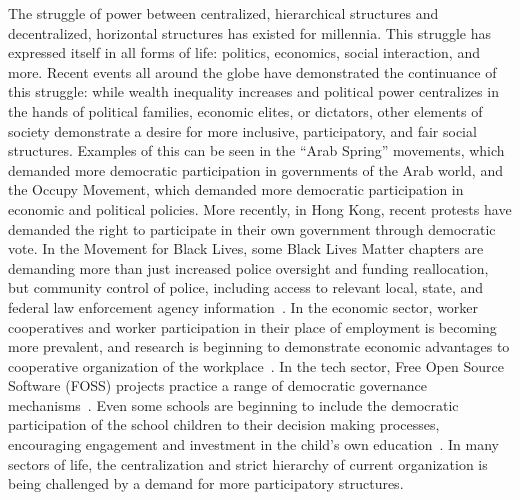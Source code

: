 The struggle of power between centralized, hierarchical structures and
decentralized, horizontal structures has existed for millennia. This struggle
has expressed itself in all forms of life: politics, economics, social
interaction, and more. Recent events all around the globe have demonstrated the
continuance of this struggle: while wealth inequality increases and political
power centralizes in the hands of political families, economic elites, or
dictators, other elements of society demonstrate a desire for more inclusive,
participatory, and fair social structures. Examples of this can be seen in the
``Arab Spring'' movements, which demanded more democratic participation in
governments of the Arab world, and the Occupy Movement, which demanded more
democratic participation in economic and political policies. More recently, in
Hong Kong, recent protests have demanded the right to participate in their own
government through democratic vote. In the Movement for Black Lives, some Black
Lives Matter chapters are demanding more than just increased police oversight
and funding reallocation, but community control of police, including access to
relevant local, state, and federal law enforcement agency
information~\cite{m4bl2021}. In the economic sector, worker cooperatives and
worker participation in their place of employment is becoming more prevalent,
and research is beginning to demonstrate economic advantages to cooperative
organization of the
workplace~\cite{jackall19846,wright2014worker, lindenfeld1982workplace}.
In the tech sector, Free Open Source Software (FOSS) projects practice a range
of democratic governance mechanisms~\cite{foss}.
Even some schools are beginning to include the democratic participation of the
school children to their decision making processes, encouraging engagement and
investment in the child's own education~\cite{pacheco2008escola}. In many
sectors of life, the centralization and strict hierarchy of current organization
is being challenged by a demand for more participatory structures.

